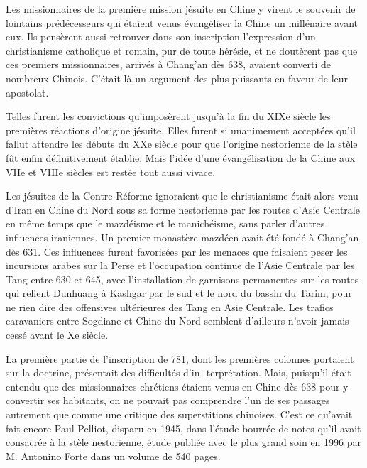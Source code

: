 Les missionnaires de la première mission jésuite en Chine y virent le
souvenir de lointains prédécesseurs qui étaient venus évangéliser la
Chine un millénaire avant eux. Ils pensèrent aussi retrouver dans son
inscription l'expression d'un christianisme catholique et romain, pur de
toute hérésie, et ne doutèrent pas que ces premiers missionnaires,
arrivés à Chang'an dès 638, avaient converti de nombreux Chinois.
C'était là un argument des plus puissants en faveur de leur apostolat.

Telles furent les convictions qu'imposèrent jusqu'à la fin du XIXe
siècle les premières réactions d'origine jésuite. Elles furent si
unanimement acceptées qu'il fallut attendre les débuts du XXe siècle
pour que l'origine nestorienne de la stèle fût enfin définitivement
établie. Mais l'idée d'une évangélisation de la Chine aux VIIe et VIIIe
siècles est restée tout aussi vivace.

Les jésuites de la Contre-Réforme ignoraient que le christianisme
était alors venu d'Iran en Chine du Nord sous sa forme nestorienne par
les routes d'Asie Centrale en même temps que le mazdéisme et le
manichéisme, sans parler d'autres influences iraniennes. Un premier
monastère mazdéen avait été fondé à Chang'an dès 631. Ces influences
furent favorisées par les menaces que faisaient peser les incursions
arabes sur la Perse et l'occupation continue de l'Asie Centrale par les
Tang entre 630 et 645, avec l'installation de garnisons permanentes sur
les routes qui relient Dunhuang à Kashgar par le sud et le nord du
bassin du Tarim, pour ne rien dire des offensives ultérieures des Tang
en Asie Centrale. Les trafics caravaniers entre Sogdiane et Chine du
Nord semblent d'ailleurs n'avoir jamais cessé avant le Xe siècle.
 
La première partie de l'inscription de 781, dont les premières colonnes
portaient sur la doctrine, présentait des difficultés d'in-
terprétation. Mais, puisqu'il était entendu que des missionnaires
chrétiens étaient venus en Chine dès 638 pour y convertir ses habitants,
on ne pouvait pas comprendre l'un de ses passages autrement que comme
une critique des superstitions chinoises. C'est ce qu'avait fait encore
Paul Pelliot, disparu en 1945, dans l'étude bourrée de notes qu'il avait
consacrée à la stèle nestorienne, étude publiée avec le plus grand
soin en 1996 par
M. Antonino Forte dans un volume de 540 pages.

